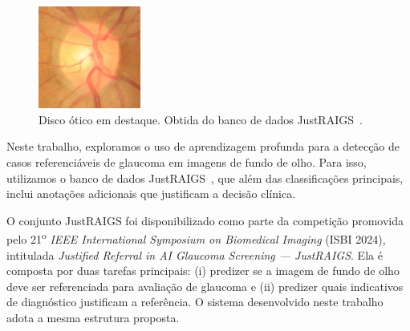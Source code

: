 \documentclass[12pt]{article}
\begin{document}
\begin{figure}[htb]
 \centering
 \includegraphics[width=0.3\textwidth]{images/disk.jpg}
 \caption{Disco ótico em destaque. Obtida do banco de dados JustRAIGS~\cite{justraigs}.}
 \label{fig:disk}
\end{figure}

Neste trabalho, exploramos o uso de aprendizagem profunda para a detecção de casos referenciáveis de glaucoma em imagens de fundo de olho. Para isso, utilizamos o banco de dados JustRAIGS~\cite{justraigs}, que além das classificações principais, inclui anotações adicionais que justificam a decisão clínica.



O conjunto JustRAIGS foi disponibilizado como parte da competição promovida pelo 21\textsuperscript{o} \textit{IEEE International Symposium on Biomedical Imaging} (ISBI 2024), intitulada \textit{Justified Referral in AI Glaucoma Screening --- JustRAIGS}. Ela é composta por duas tarefas principais: (i) predizer se a imagem de fundo de olho deve ser referenciada para avaliação de glaucoma e (ii) predizer quais indicativos de diagnóstico justificam a referência. O sistema desenvolvido neste trabalho adota a mesma estrutura proposta.
\end{document}
